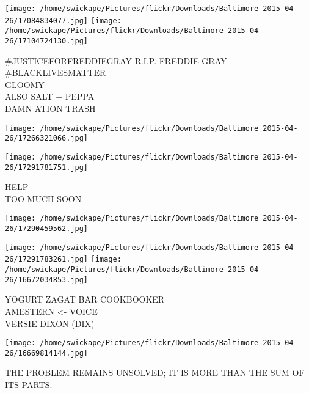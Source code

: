 \documentclass[10pt,letterpaper]{article}
\begin{document}
\texttt{[image: /home/swickape/Pictures/flickr/Downloads/Baltimore 2015-04-26/17084834077.jpg]}
\texttt{[image: /home/swickape/Pictures/flickr/Downloads/Baltimore 2015-04-26/17104724130.jpg]}

\#JUSTICEFORFREDDIEGRAY R.I.P. FREDDIE GRAY \#BLACKLIVESMATTER\\
GLOOMY\\
ALSO SALT + PEPPA\\
DAMN ATION TRASH\\
\pagebreak

\texttt{[image: /home/swickape/Pictures/flickr/Downloads/Baltimore 2015-04-26/17266321066.jpg]}

\vspace{0.25in}
\texttt{[image: /home/swickape/Pictures/flickr/Downloads/Baltimore 2015-04-26/17291781751.jpg]}

HELP\\
TOO MUCH SOON\\
\pagebreak

\texttt{[image: /home/swickape/Pictures/flickr/Downloads/Baltimore 2015-04-26/17290459562.jpg]}

\vspace{0.25in}
\texttt{[image: /home/swickape/Pictures/flickr/Downloads/Baltimore 2015-04-26/17291783261.jpg]}
\texttt{[image: /home/swickape/Pictures/flickr/Downloads/Baltimore 2015-04-26/16672034853.jpg]}

YOGURT ZAGAT BAR COOKBOOKER\\
AMESTERN <{-} VOICE\\
VERSIE DIXON (DIX)\\
\pagebreak

\texttt{[image: /home/swickape/Pictures/flickr/Downloads/Baltimore 2015-04-26/16669814144.jpg]}

THE PROBLEM REMAINS UNSOLVED; IT IS MORE THAN THE SUM OF ITS PARTS.\\
\pagebreak
\end{document}
